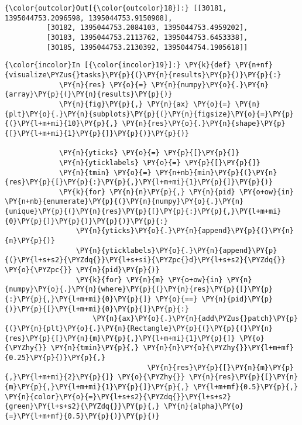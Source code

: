             \begin{Verbatim}[commandchars=\\\{\}]
{\color{outcolor}Out[{\color{outcolor}18}]:} [[30181, 1395044753.2096598, 1395044753.9150908],
          [30182, 1395044753.2084103, 1395044753.4959202],
          [30183, 1395044753.2113762, 1395044753.6453338],
          [30185, 1395044753.2130392, 1395044754.1905618]]
\end{Verbatim}
        


    \begin{Verbatim}[commandchars=\\\{\}]
{\color{incolor}In [{\color{incolor}19}]:} \PY{k}{def} \PY{n+nf}{visualize\PYZus{}tasks}\PY{p}{(}\PY{n}{results}\PY{p}{)}\PY{p}{:}
             \PY{n}{res} \PY{o}{=} \PY{n}{numpy}\PY{o}{.}\PY{n}{array}\PY{p}{(}\PY{n}{results}\PY{p}{)}
             \PY{n}{fig}\PY{p}{,} \PY{n}{ax} \PY{o}{=} \PY{n}{plt}\PY{o}{.}\PY{n}{subplots}\PY{p}{(}\PY{n}{figsize}\PY{o}{=}\PY{p}{(}\PY{l+m+mi}{10}\PY{p}{,} \PY{n}{res}\PY{o}{.}\PY{n}{shape}\PY{p}{[}\PY{l+m+mi}{1}\PY{p}{]}\PY{p}{)}\PY{p}{)}
             
             \PY{n}{yticks} \PY{o}{=} \PY{p}{[}\PY{p}{]}
             \PY{n}{yticklabels} \PY{o}{=} \PY{p}{[}\PY{p}{]}
             \PY{n}{tmin} \PY{o}{=} \PY{n+nb}{min}\PY{p}{(}\PY{n}{res}\PY{p}{[}\PY{p}{:}\PY{p}{,}\PY{l+m+mi}{1}\PY{p}{]}\PY{p}{)}
             \PY{k}{for} \PY{n}{n}\PY{p}{,} \PY{n}{pid} \PY{o+ow}{in} \PY{n+nb}{enumerate}\PY{p}{(}\PY{n}{numpy}\PY{o}{.}\PY{n}{unique}\PY{p}{(}\PY{n}{res}\PY{p}{[}\PY{p}{:}\PY{p}{,}\PY{l+m+mi}{0}\PY{p}{]}\PY{p}{)}\PY{p}{)}\PY{p}{:}
                 \PY{n}{yticks}\PY{o}{.}\PY{n}{append}\PY{p}{(}\PY{n}{n}\PY{p}{)}
                 \PY{n}{yticklabels}\PY{o}{.}\PY{n}{append}\PY{p}{(}\PY{l+s+s2}{\PYZdq{}}\PY{l+s+si}{\PYZpc{}d}\PY{l+s+s2}{\PYZdq{}} \PY{o}{\PYZpc{}} \PY{n}{pid}\PY{p}{)}
                 \PY{k}{for} \PY{n}{m} \PY{o+ow}{in} \PY{n}{numpy}\PY{o}{.}\PY{n}{where}\PY{p}{(}\PY{n}{res}\PY{p}{[}\PY{p}{:}\PY{p}{,}\PY{l+m+mi}{0}\PY{p}{]} \PY{o}{==} \PY{n}{pid}\PY{p}{)}\PY{p}{[}\PY{l+m+mi}{0}\PY{p}{]}\PY{p}{:}
                     \PY{n}{ax}\PY{o}{.}\PY{n}{add\PYZus{}patch}\PY{p}{(}\PY{n}{plt}\PY{o}{.}\PY{n}{Rectangle}\PY{p}{(}\PY{p}{(}\PY{n}{res}\PY{p}{[}\PY{n}{m}\PY{p}{,}\PY{l+m+mi}{1}\PY{p}{]} \PY{o}{\PYZhy{}} \PY{n}{tmin}\PY{p}{,} \PY{n}{n}\PY{o}{\PYZhy{}}\PY{l+m+mf}{0.25}\PY{p}{)}\PY{p}{,}
                                  \PY{n}{res}\PY{p}{[}\PY{n}{m}\PY{p}{,}\PY{l+m+mi}{2}\PY{p}{]} \PY{o}{\PYZhy{}} \PY{n}{res}\PY{p}{[}\PY{n}{m}\PY{p}{,}\PY{l+m+mi}{1}\PY{p}{]}\PY{p}{,} \PY{l+m+mf}{0.5}\PY{p}{,} \PY{n}{color}\PY{o}{=}\PY{l+s+s2}{\PYZdq{}}\PY{l+s+s2}{green}\PY{l+s+s2}{\PYZdq{}}\PY{p}{,} \PY{n}{alpha}\PY{o}{=}\PY{l+m+mf}{0.5}\PY{p}{)}\PY{p}{)}
                 

\end{Verbatim}
